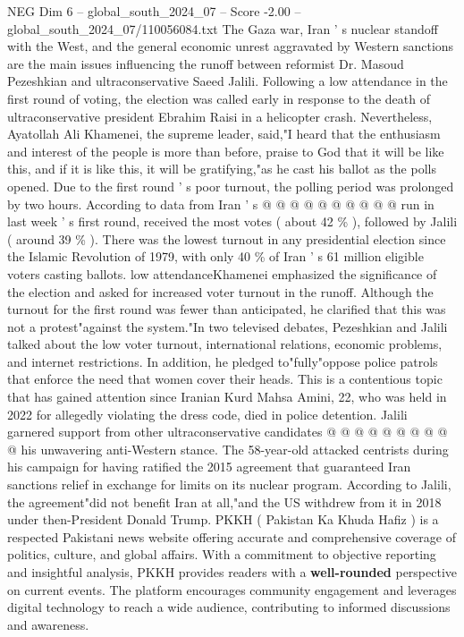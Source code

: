 \begin{textsample}{NEG Dim 6 – global\_south\_2024\_07 – Score -2.00 – global\_south\_2024\_07/110056084.txt}
The Gaza war, Iran ' s nuclear standoff with the West, and the general economic unrest aggravated by Western sanctions are the main issues influencing the runoff between reformist Dr.
Masoud Pezeshkian and ultraconservative Saeed Jalili.
Following a low attendance in the first round of voting, the election was called early in response to the death of ultraconservative president Ebrahim Raisi in a helicopter crash.
Nevertheless, Ayatollah Ali Khamenei, the supreme leader, said,"I heard that the enthusiasm and interest of the people is more than before, praise to God that it will be like this, and if it is like this, it will be gratifying,"as he cast his ballot as the polls opened.
Due to the first round ' s poor turnout, the polling period was prolonged by two hours.
According to data from Iran ' s @ @ @ @ @ @ @ @ @ @ run in last week ' s first round, received the most votes ( about 42 \% ), followed by Jalili ( around 39 \% ).
There was the lowest turnout in any presidential election since the Islamic Revolution of 1979, with only 40 \% of Iran ' s 61 million eligible voters casting ballots. low attendanceKhamenei emphasized the significance of the election and asked for increased voter turnout in the runoff.
Although the turnout for the first round was fewer than anticipated, he clarified that this was not a protest"against the system."In two televised debates, Pezeshkian and Jalili talked about the low voter turnout, international relations, economic problems, and internet restrictions.
In addition, he pledged to"fully"oppose police patrols that enforce the need that women cover their heads.
This is a contentious topic that has gained attention since Iranian Kurd Mahsa Amini, 22, who was held in 2022 for allegedly violating the dress code, died in police detention.
Jalili garnered support from other ultraconservative candidates @ @ @ @ @ @ @ @ @ @ his unwavering anti-Western stance.
The 58-year-old attacked centrists during his campaign for having ratified the 2015 agreement that guaranteed Iran sanctions relief in exchange for limits on its nuclear program.
According to Jalili, the agreement"did not benefit Iran at all,"and the US withdrew from it in 2018 under then-President Donald Trump.
PKKH ( Pakistan Ka Khuda Hafiz ) is a respected Pakistani news website offering accurate and comprehensive coverage of politics, culture, and global affairs.
With a commitment to objective reporting and insightful analysis, PKKH provides readers with a \textbf{well-rounded} perspective on current events.
The platform encourages community engagement and leverages digital technology to reach a wide audience, contributing to informed discussions and awareness.

\end{textsample}
